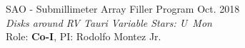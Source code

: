 \documentclass[12pt]{article}
\begin{document}
\begin{etaremune}




\item SAO - Submillimeter Array Filler Program \hfill Oct. 2018 \\
\textit{Disks around RV Tauri Variable Stars: U~Mon} \\ Role: \textbf{Co-I}, PI: Rodolfo Montez Jr.



\end{etaremune}

\end{document}
